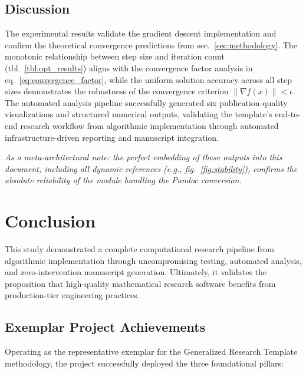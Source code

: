 \documentclass[
  english,
]{article}
\begin{document}
\subsection{Discussion}\label{discussion}

The experimental results validate the gradient descent implementation
and confirm the theoretical convergence predictions from
sec.~\ref{sec:methodology}. The monotonic relationship between step size
and iteration count (tbl.~\ref{tbl:opt_results}) aligns with the
convergence factor analysis in eq.~\ref{eq:convergence_factor}, while
the uniform solution accuracy across all step sizes demonstrates the
robustness of the convergence criterion \(\|\nabla f(x)\| < \epsilon\).
The automated analysis pipeline successfully generated six
publication-quality visualizations and structured numerical outputs,
validating the template's end-to-end research workflow from algorithmic
implementation through automated infrastructure-driven reporting and
manuscript integration.

\emph{As a meta-architectural note: the perfect embedding of these
outputs into this document, including all dynamic references (e.g.,
fig.~\ref{fig:stability}), confirms the absolute reliability of the
 module handling the
Pandoc conversion.}

\newpage

\section{Conclusion}\label{sec:conclusion}

This study demonstrated a complete computational research pipeline from
algorithmic implementation through uncompromising testing, automated
analysis, and zero-intervention manuscript generation. Ultimately, it
validates the proposition that high-quality mathematical research
software benefits from production-tier engineering practices.

\subsection{Exemplar Project
Achievements}\label{exemplar-project-achievements}

Operating as the representative exemplar for the Generalized Research
Template methodology, the project successfully deployed the three
foundational pillars:
\end{document}
